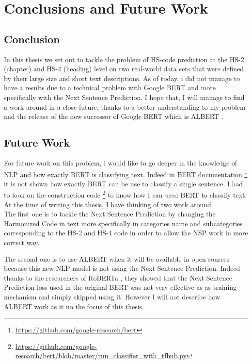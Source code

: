 \chapter{Conclusions and Future Work}\label{ch:concl}
\section{Conclusion}
In this thesis we set out to tackle the problem of HS-code prediction at the HS-2 (chapter) and HS-4 (heading) level on two real-world data sets that were defined by their large size and short text descriptions. As of today, i did not manage to have a results due to a technical problem with Google BERT and more specifically with the Next Sentence Prediction. I hope that, I will manage to find a work around in a close future. thanks to a better understanding to my problem and the release of the new successor of Google BERT which is ALBERT \cite{Lan}.

\section{Future Work}
For future work on this problem, i would like to go deeper in the knowledge of NLP and how exactly BERT is classifying text. Indeed in BERT documentation \footnote{\url{https://github.com/google-research/bert}} it is not shown how exactly BERT can be use to classify a single sentence. I had to look on the construction code \footnote{\url{https://github.com/google-research/bert/blob/master/run_classifier_with_tfhub.py}} to know how I can used BERT to classify text. 
At the time of writing this thesis, I have thinking of two work around. \\

The first one is to tackle the Next Sentence Prediction by changing the Harmonized Code in text more specifically in categories name and subcategories corresponding to the HS-2 and HS-4 code in order to allow the NSP work in more correct way.

The second one is to use ALBERT \cite{Lan} when it will be available in open sources because this new NLP model is not using the Next Sentence Prediction. Indeed thanks to the researchers of RoBERTa \cite{Liu2019b} , they showed that the Next Sentence Prediction loss used in the original BERT was not very effective as as training mechanism and simply skipped using it. 
However I will not describe how ALBERT\cite{Lan} work as it no the focus of this thesis.
